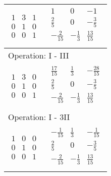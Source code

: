 \begin{longtable}{p{4cm}|p{3cm}}
    $\displaystyle\begin{matrix}
                          1 & 3 & 1 \\
                          0 & 1 & 0 \\
                          0 & 0 & 1
                      \end{matrix}$         &
    $\displaystyle\begin{matrix}
                          1             & 0            & -1            \\
                          \frac{2}{5}   & 0            & -\frac{3}{5}  \\
                          -\frac{2}{15} & -\frac{1}{3} & \frac{13}{15} \\
                      \end{matrix}$                             \\\hline
    \multicolumn{2}{p{\dimexpr4cm+3cm+2\tabcolsep\relax}}{Operation: I - III}              \\\hline\pagebreak[0]

    $\displaystyle\begin{matrix}
                          1 & 3 & 0 \\
                          0 & 1 & 0 \\
                          0 & 0 & 1
                      \end{matrix}$         &
    $\displaystyle\begin{matrix}
                          \frac{17}{15} & \frac{1}{3}  & -\frac{28}{15} \\
                          \frac{2}{5}   & 0            & -\frac{3}{5}   \\
                          -\frac{2}{15} & -\frac{1}{3} & \frac{13}{15}  \\
                      \end{matrix}$                            \\\hline
    \multicolumn{2}{p{\dimexpr4cm+3cm+2\tabcolsep\relax}}{Operation: I - 3II}              \\\hline\pagebreak[0]

    $\displaystyle\begin{matrix}
                          1 & 0 & 0 \\
                          0 & 1 & 0 \\
                          0 & 0 & 1
                      \end{matrix}$         &
    $\displaystyle\begin{matrix}
                          -\frac{1}{15} & \frac{1}{3}  & -\frac{1}{15} \\
                          \frac{2}{5}   & 0            & -\frac{3}{5}  \\
                          -\frac{2}{15} & -\frac{1}{3} & \frac{13}{15} \\
                      \end{matrix}$                             \\\hline

\end{longtable}

